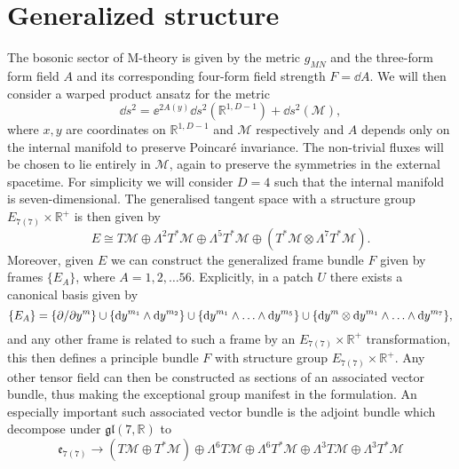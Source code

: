 \section{Generalized structure}
The bosonic sector of M-theory is given by the metric $g_{MN}$ and the three-form form field $A$ and its corresponding four-form field strength $F=\dd A$. We will then consider a warped product ansatz for the metric 
\begin{equation}
    \dd s^2 = \ee^{2A(y)}\dd s^2(\mathbb{R}^{1,D-1})+\dd s^2(\mathcal{M}),
\end{equation}
where $x,y$ are coordinates on $\mathbb{R}^{1,D-1}$ and $\mathcal{M}$ respectively and $A$ depends only on the internal manifold to preserve Poincaré invariance. The non-trivial fluxes will be chosen to lie entirely in $\mathcal{M}$, again to preserve the symmetries in the external spacetime. For simplicity we will consider $D=4$ such that the internal manifold is seven-dimensional. The generalised tangent space with a structure group $E_{7(7)}\times\mathbb{R}^+$ is then given by 
\begin{equation}
    E \cong T\mathcal{M}\oplus\Lambda^2T^*\mathcal{M}\oplus\Lambda^5T^*\mathcal{M}\oplus\left(T^*\mathcal{M}\otimes\Lambda^7 T^*\mathcal{M}\right).
\end{equation}
Moreover, given $E$ we can construct the generalized frame bundle $F$ given by frames $\{E_A\}$, where $A=1,2,\ldots 56$. Explicitly, in a patch $U$ there exists a canonical basis given by 
\begin{equation}
    \{E_A\} = \{\partial/\partial y^m\}\cup \{\mathrm{d} y^{m_1}\wedge\mathrm{d} y^{m_2}\}\cup\{\mathrm{d} y^{m_1}\wedge\ldots\wedge\mathrm{d} y^{m_5}\}\cup \{\mathrm{d} y^m\otimes\mathrm{d} y^{m_1}\wedge\ldots\wedge\mathrm{d} y^{m_7}\},
\end{equation}
and any other frame is related to such a frame by an $E_{7(7)}\times \mathbb{R}^+$ transformation, this then defines a principle bundle $F$ with structure group $E_{7(7)}\times \mathbb{R}^+$. Any other tensor field can then be constructed as sections of an associated vector bundle, thus making the exceptional group manifest in the formulation. An especially important such associated vector bundle is the adjoint bundle which decompose under $\mathfrak{gl}(7,\mathbb{R})$ to
\begin{equation}
    \mathfrak{e}_{7(7)}\to \left(T\mathcal{M}\oplus T^*\mathcal{M}\right)\oplus\Lambda^6T\mathcal{M}\oplus\Lambda^6T^*\mathcal{M}\oplus\Lambda^3T\mathcal{M}\oplus\Lambda^3T^*\mathcal{M}
\end{equation}
